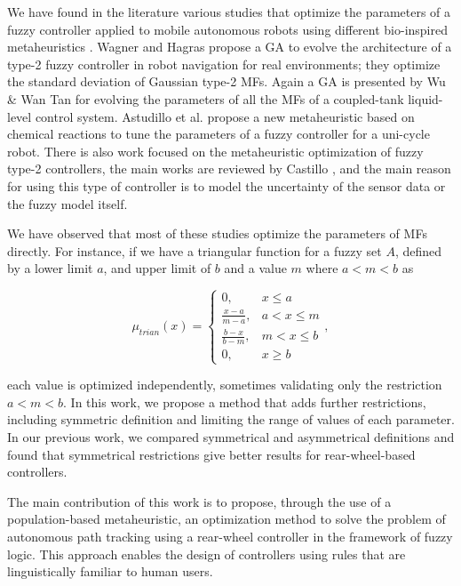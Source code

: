 \documentclass[symmetry,article,submit,moreauthors,pdftex]{Definitions/mdpi}
\begin{document}
We have found in the literature various studies that optimize the parameters of
a fuzzy controller applied to mobile autonomous robots using different
bio-inspired metaheuristics
\cite{hernandez_optimization_2019,lagunes_methodology_2017}.  Wagner and Hagras
\cite{wagner2007genetic} propose a GA to evolve the architecture of a type-2
fuzzy controller in robot navigation for real environments; they optimize the
standard deviation of Gaussian type-2 MFs.  Again a GA is presented by Wu \&
Wan Tan \cite{wu2006genetic} for evolving the parameters of all the MFs of a
coupled-tank liquid-level control system.  Astudillo et al.
\cite{astudillo2013optimization} propose a new metaheuristic based on chemical
reactions to tune the parameters of a fuzzy controller for a uni-cycle robot.
There is also work focused on the metaheuristic optimization of fuzzy type-2
controllers, the main works are reviewed by Castillo
\cite{castillo_review_2012}, and the main reason for using this type of
controller is to model the uncertainty of the sensor data or the fuzzy model
itself.


We have observed that most of these studies optimize the parameters of MFs
directly. For instance, if we have a triangular function for a fuzzy set $A$,
defined by a lower limit $a$, and upper limit of $b$ and a value $m$ where $a <
m <b$ as 

\begin{equation}\label{eq:triangular}
\mu_{trian}(x) = 
\begin{cases}
    0, & x \le a \\
    \frac{x-a}{m-a}, & a < x \le m \\ 
    \frac{b-x}{b-m}, & m < x \le b \\ 
    0, & x \ge b
\end{cases},
\end{equation}

each value is optimized independently, sometimes validating only the
restriction $a < m <b$. In this work, we propose a method that adds further
restrictions, including symmetric definition and limiting the range of values
of each parameter. In our previous work, we compared symmetrical and
asymmetrical definitions and found that symmetrical restrictions give better
results for rear-wheel-based controllers. 

The main contribution of this work is to propose, through the use of a
population-based metaheuristic, an optimization method to solve the problem of
autonomous path tracking using a rear-wheel controller in the framework of
fuzzy logic. This approach enables the design of controllers using rules that
are linguistically familiar to human users.
\end{document}
